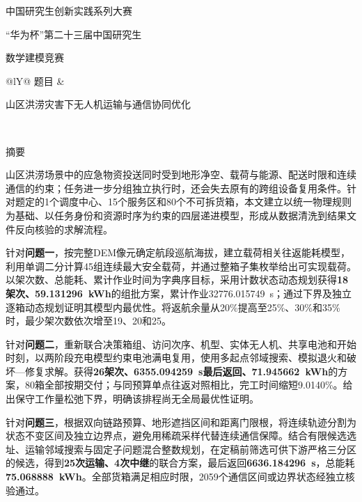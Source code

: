 \documentclass[a4paper]{my_paper}%
\numberwithin{equation}{section}
\theoremstyle{definition}
\newcommand{\QOneSorties}{18}
\newcommand{\QOneEnergy}{59.131296}
\newcommand{\QOneWorkSeconds}{32776.015749}
\newcommand{\QTwoSorties}{26}
\newcommand{\QTwoMakespan}{6355.094259}
\newcommand{\QTwoEnergy}{71.945662}
\newcommand{\QThreeTransportSorties}{25}
\newcommand{\QThreeRelaySorties}{4}
\newcommand{\QThreeMakespan}{6636.184296}
\newcommand{\QThreeEnergy}{75.068888}
\begin{document}
\songti{}
\setcounter{page}{1}
\begin{center}
 {\heiti 中国研究生创新实践系列大赛\par}
 \vspace{.35em}
 {\heiti “华为杯”第二十三届中国研究生\par}
 \vspace{.35em}
 {\heiti 数学建模竞赛\par}
\end{center}
\vspace{.6em}
\noindent\begin{tabularx}{\textwidth}{@{}lY@{}}
 题\quad 目 & {\centering{}\heiti 山区洪涝灾害下无人机运输与通信协同优化\par}\\[.1em]
\end{tabularx}
\begin{center}\heiti 摘\qquad 要\end{center}


山区洪涝场景中的应急物资投送同时受到地形净空、载荷与能源、配送时限和连续通信的约束；任务进一步分组独立执行时，还会失去原有的跨组设备复用条件。针对题定的1个调度中心、15个服务区和80个不可拆货箱，本文建立以统一物理规则为基础、以任务身份和资源时序为约束的四层递进模型，形成从数据清洗到结果文件反向核验的求解流程。

针对\textbf{问题一}，按完整DEM像元确定航段巡航海拔，建立载荷相关往返能耗模型，利用单调二分计算45组连续最大安全载荷，并通过整箱子集枚举给出可实现载荷。以架次数、总能耗、累计作业时间为字典序目标，采用计数状态动态规划获得\textbf{\QOneSorties 架次、\QOneEnergy\ kWh}的组批方案，累计作业\QOneWorkSeconds\ s；通过下界及独立逐箱动态规划证明其模型内最优性。将返航余量从20\%提高至25\%、30\%和35\%时，最少架次数依次增至19、20和25。

针对\textbf{问题二}，重新联合决策箱组、访问次序、机型、实体无人机、共享电池和开始时刻，以两阶段充电模型约束电池满电复用，使用多起点邻域搜索、模拟退火和破坏—修复求解。获得\textbf{\QTwoSorties 架次、\QTwoMakespan\ s最后返回、\QTwoEnergy\ kWh}的方案，80箱全部按期交付；与同预算单点往返对照相比，完工时间缩短9.0140\%。给出保守工作量松弛下界，明确该排程尚无全局最优性证明。

针对\textbf{问题三}，根据双向链路预算、地形遮挡区间和距离门限根，将连续轨迹分割为状态不变区间及独立边界点，避免用稀疏采样代替连续通信保障。结合有限候选选址、运输邻域搜索与固定子问题混合整数规划，在定稿前筛选可供下游严格三分区的候选，得到\textbf{\QThreeTransportSorties 次运输、\QThreeRelaySorties 次中继}的联合方案，最后返回\textbf{\QThreeMakespan\ s}，总能耗\textbf{\QThreeEnergy\ kWh}。全部货箱满足相应时限，2059个通信区间或边界状态经独立核验通过。
\end{document}
